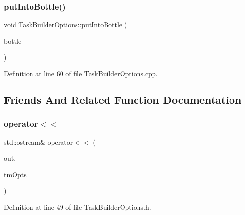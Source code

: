 \hypertarget{classocra_1_1TaskBuilderOptions_abc99093a68bc991fa711aa6a7e55506a}{}\label{classocra_1_1TaskBuilderOptions_abc99093a68bc991fa711aa6a7e55506a} 
\subsubsection{\texorpdfstring{put\+Into\+Bottle()}{putIntoBottle()}}
{\footnotesize\ttfamily void Task\+Builder\+Options\+::put\+Into\+Bottle (\begin{DoxyParamCaption}\item[{yarp\+::os\+::\+Bottle \&}]{bottle }\end{DoxyParamCaption})}



Definition at line 60 of file Task\+Builder\+Options.\+cpp.



\subsection{Friends And Related Function Documentation}
\hypertarget{classocra_1_1TaskBuilderOptions_a414b60ce008b85fc9ec6fac4e9f6f8d7}{}\label{classocra_1_1TaskBuilderOptions_a414b60ce008b85fc9ec6fac4e9f6f8d7} 
\subsubsection{\texorpdfstring{operator$<$$<$}{operator<<}}
{\footnotesize\ttfamily std\+::ostream\& operator$<$$<$ (\begin{DoxyParamCaption}\item[{std\+::ostream \&}]{out,  }\item[{const \hyperlink{classocra_1_1TaskBuilderOptions}{Task\+Builder\+Options} \&}]{tm\+Opts }\end{DoxyParamCaption})\hspace{0.3cm}{\ttfamily [friend]}}



Definition at line 49 of file Task\+Builder\+Options.\+h.



